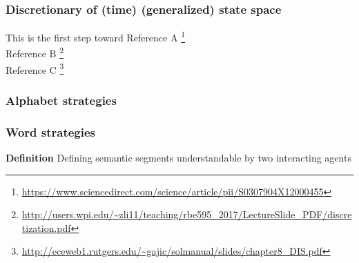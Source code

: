 \documentclass{article}
\begin{document}
		\subsubsection{Discretionary of (time) (generalized) state space}
		This is the first step toward
		Reference A \footnote{\url{https://www.sciencedirect.com/science/article/pii/S0307904X12000455}}
		\\
		Reference B \footnote{\url{http://users.wpi.edu/~zli11/teaching/rbe595_2017/LectureSlide_PDF/discretization.pdf}}
		\\
		Reference C \footnote{\url{http://eceweb1.rutgers.edu/~gajic/solmanual/slides/chapter8_DIS.pdf}}
		\subsubsection{Alphabet strategies}
		\subsubsection{Word strategies}
		\textbf{Definition} Defining semantic segments understandable by two interacting agents
\end{document}
